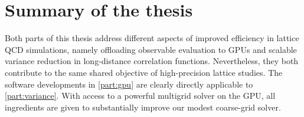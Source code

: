 \chapter{Summary of the thesis}
\label{ch:summary}






Both parts of this thesis address different aspects of improved efficiency in lattice QCD simulations, namely offloading observable evaluation to GPUs and scalable variance reduction in long-distance correlation functions.
Nevertheless, they both contribute to the same shared objective of high-precision lattice studies.
The software developments in \cref{part:gpu} are clearly directly applicable to \cref{part:variance}.
With access to a powerful multigrid solver on the GPU, all ingredients are given to substantially improve our modest coarse-grid solver.

